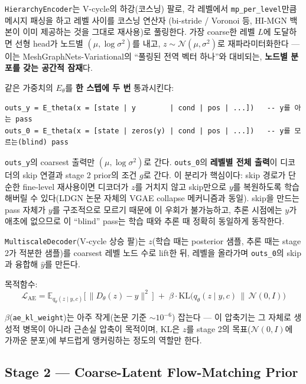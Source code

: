 \documentclass[11pt]{article}
\begin{document}
\texttt{HierarchyEncoder}는 V-cycle의 하강(코스닝) 팔로, 각 레벨에서
\texttt{mp\_per\_level}만큼 메시지 패싱을 하고 레벨 사이를 코스닝 연산자
(bi-stride / Voronoi 등, HI-MGN 백본이 이미 제공하는 것을 그대로 재사용)로
풀링한다. 가장 coarse한 레벨 $L$에 도달하면 선형 head가 노드별
$(\mu,\log\sigma^2)$를 내고, $z \sim \mathcal{N}(\mu,\sigma^2)$로
재파라미터화한다 --- 이는 MeshGraphNets-Variational의 ``풀링된 전역 벡터
하나''와 대비되는, \textbf{노드별 분포를 갖는 공간적 잠재}다.

같은 가중치의 $E_\theta$를 \textbf{한 스텝에 두 번} 통과시킨다:

\begin{verbatim}
outs_y = E_theta(x = [state | y        | cond | pos | ...])   -- y를 아는 pass
outs_0 = E_theta(x = [state | zeros(y) | cond | pos | ...])   -- y를 모르는(blind) pass
\end{verbatim}

\texttt{outs\_y}의 coarsest 출력만 $(\mu,\log\sigma^2)$로 간다.
\texttt{outs\_0}의 \textbf{레벨별 전체 출력}이 디코더의 skip 연결과
stage 2 prior의 조건 $g$로 간다. 이 분리가 핵심이다: skip 경로가 단순한
fine-level 재사용이면 디코더가 $z$를 거치지 않고 skip만으로 $y$를
복원하도록 학습해버릴 수 있다(LDGN 논문 자체의 VGAE collapse 메커니즘과
동일). skip을 만드는 pass 자체가 $y$를 구조적으로 모르기 때문에 이
우회가 불가능하고, 추론 시점에는 $y$가 애초에 없으므로 이 ``blind''
pass는 학습 때와 추론 때 정확히 동일하게 동작한다.

\texttt{MultiscaleDecoder}(V-cycle 상승 팔)는 $z$(학습 때는 posterior
샘플, 추론 때는 stage 2가 적분한 샘플)를 coarsest 레벨 노드 수로 lift한
뒤, 레벨을 올라가며 \texttt{outs\_0}의 skip과 융합해 $\hat y$를 만든다.

목적함수:
\begin{equation}
\mathcal{L}_{\text{AE}} = \mathbb{E}_{q_\theta(z\mid y,c)}\Big[\, \lVert D_\theta(z) - y \rVert^2 \,\Big] \;+\; \beta \cdot \mathrm{KL}\big(q_\theta(z\mid y,c) \,\|\, \mathcal{N}(0,I)\big)
\end{equation}

$\beta$(\texttt{ae\_kl\_weight})는 아주 작게(논문 기준 $\sim 10^{-6}$)
잡는다 --- 이 압축기는 그 자체로 생성적 병목이 아니라 근손실 압축이
목적이며, KL은 $z$를 stage 2의 목표($\mathcal{N}(0,I)$에 가까운 분포)에
부드럽게 앵커링하는 정도의 역할만 한다.

\subsection{Stage 2 --- Coarse-Latent Flow-Matching Prior}
\end{document}
